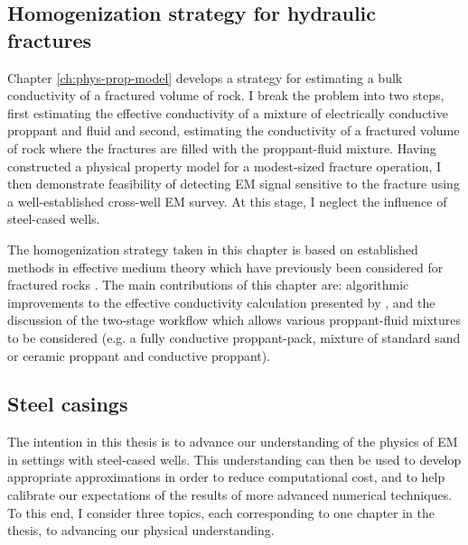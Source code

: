 \subsection{Homogenization strategy for hydraulic fractures}
Chapter \ref{ch:phys-prop-model} develops a strategy for estimating a bulk conductivity of a fractured volume of rock. I break the problem into two steps, first estimating the effective conductivity of a mixture of electrically conductive proppant and fluid and second, estimating the conductivity of a fractured volume of rock where the fractures are filled with the proppant-fluid mixture. Having constructed a physical property model for a modest-sized fracture operation, I then demonstrate feasibility of detecting EM signal sensitive to the fracture using a well-established cross-well EM survey. At this stage, I neglect the influence of steel-cased wells.

The homogenization strategy taken in this chapter is based on established methods in effective medium theory \citep{Bruggeman1935} which have previously been considered for fractured rocks \citep{Berryman2013}. The main contributions of this chapter are: algorithmic improvements to the effective conductivity calculation presented by \cite{Berryman2013}, and the discussion of the two-stage workflow which allows various proppant-fluid mixtures to be considered (e.g. a fully conductive proppant-pack, mixture of standard sand or ceramic proppant and conductive proppant).


\subsection{Steel casings}

The intention in this thesis is to advance our understanding of the physics of EM in settings with steel-cased wells. This understanding can then be used to develop appropriate approximations in order to reduce computational cost, and to help calibrate our expectations of the results of more advanced numerical techniques. To this end, I consider three topics, each corresponding to one chapter in the thesis, to advancing our physical understanding.


